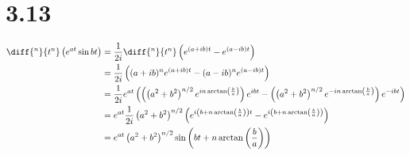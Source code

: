 \documentclass[12pt]{mypackage}
\begin{document}
\section{3.13}%
\begin{align*}
  \diff{^n}{t^n}\left(e^{at}\sin bt\right) &= \frac{1}{2i}\diff{^n}{t^n}\left(e^{\left(a + ib\right)t} - e^{\left(a - ib\right)t}\right)\\
                                           &= \frac{1}{2i}\left((a + ib)^{n}e^{\left(a + ib\right)t} - (a - ib)^{n}e^{\left(a - ib\right)t}\right)\\
                                           &= \frac{1}{2i}e^{at}\left(\left(\left(a^2 + b^2\right)^{n/2}e^{in\arctan\left(\frac{b}{a}\right)}\right)e^{ibt} - \left(\left(a^2 + b^2\right)^{n/2}e^{-in\arctan\left(\frac{b}{a}\right)}\right)e^{-ibt}\right)\\
                                           &= e^{at}\frac{1}{2i}\left(a^2 + b^2\right)^{n/2}\left(e^{i\left(b + n\arctan\left(\frac{b}{a}\right)\right)t} - e^{i\left(b + n\arctan\left(\frac{b}{a}\right)\right)}\right)\\
                                           &= e^{at}\left(a^2 + b^2\right)^{n/2}\sin\left(bt + n\arctan\left(\frac{b}{a}\right)\right)
\end{align*}
\end{document}
